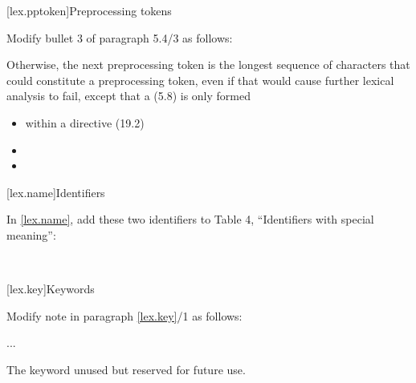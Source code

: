 \begin{after}
\setcounter{section}{3}
[lex.pptoken]{Preprocessing tokens}

Modify bullet 3 of paragraph 5.4/3 as follows:

\begin{std.txt}
Otherwise, the next preprocessing token is
the longest sequence of characters
that could constitute a preprocessing token,
even if that would cause further lexical analysis to fail,
except that a  (5.8)
is only formed
\begin{itemize}
\item
within a  directive (19.2)\added{,}

\item
{}

\item
{}
\end{itemize}
\end{std.txt}
\end{after}

\setcounter{section}{9}
[lex.name]{Identifiers}

In \ref{lex.name}, add these two identifiers to Table 4,
``Identifiers with special meaning'':

\begin{std.txt}
\\
\end{std.txt}

\setcounter{section}{10}
[lex.key]{Keywords}

\noindent
Modify note in paragraph \ref{lex.key}/1 as follows:
\begin{std.txt}
    \pnum[1]
    ...


    \enternote
    The   keyword 
    unused but   
    reserved for future use.
    \exitnote
\end{std.txt}
